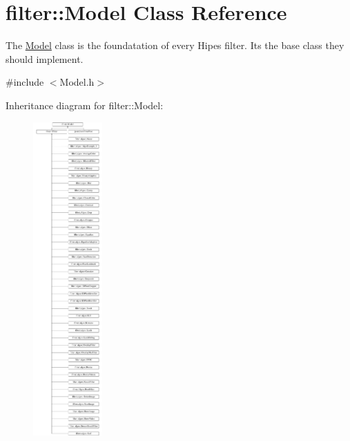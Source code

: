 \hypertarget{classfilter_1_1_model}{}\section{filter\+:\+:Model Class Reference}
\label{classfilter_1_1_model}


The \hyperlink{classfilter_1_1_model}{Model} class is the foundatation of every Hipe\textquotesingle{}s filter. It\textquotesingle{}s the base class they should implement.  




{\ttfamily \#include $<$Model.\+h$>$}

Inheritance diagram for filter\+:\+:Model\+:\begin{figure}[H]
\begin{center}
\leavevmode
\includegraphics[height=12.000000cm]{d5/d88/classfilter_1_1_model}
\end{center}
\end{figure}
